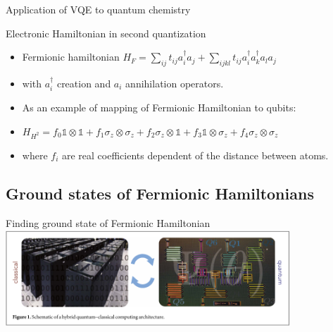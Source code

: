 \endgroup
\begingroup
\begin{frame}{Application of VQE to quantum chemistry}
    \begin{block}{Electronic Hamiltonian in second quantization}
    \begin{itemize}
        \item Fermionic hamiltonian $H_F = \sum_{ij} t_{ij} a_i^\dagger a_j + \sum_{ijkl} t_{ij} a_i^\dagger a_k^\dagger a_l a_j$
        \item with $a_i^\dagger$ creation and $a_i$ annihilation operators.
        \item As an example of mapping of Fermionic Hamiltonian to qubits:
        \item $H_{H^2} = f_0 \mathbb{1}      \otimes \mathbb{1} + 
                        f_1 \sigma_z \otimes \sigma_z + 
                        f_2 \sigma_z \otimes \mathbb{1} + 
                        f_3 \mathbb{1}        \otimes \sigma_z + 
                        f_4 \sigma_z \otimes \sigma_z  $
        \item where $f_i$ are real coefficients dependent of the distance between atoms.
    \end{itemize}
    \end{block}
\end{frame}
\endgroup
\subsection{Ground states of Fermionic Hamiltonians}
\begingroup
\nologo
\begin{frame}{Finding ground state of Fermionic Hamiltonian}
    \centering
    \includegraphics[page=4, width=0.8\textwidth]{pics/vqe.pdf}
\end{frame}
\endgroup
